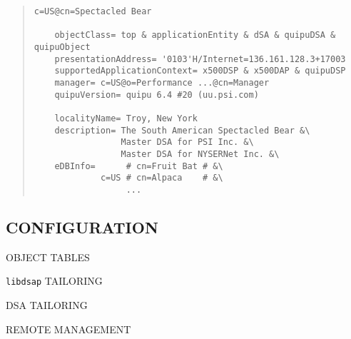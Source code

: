\begin{bwslide}

\begin{quote}\small\begin{verbatim}
c=US@cn=Spectacled Bear

    objectClass= top & applicationEntity & dSA & quipuDSA & quipuObject
    presentationAddress= '0103'H/Internet=136.161.128.3+17003
    supportedApplicationContext= x500DSP & x500DAP & quipuDSP
    manager= c=US@o=Performance ...@cn=Manager
    quipuVersion= quipu 6.4 #20 (uu.psi.com)

    localityName= Troy, New York
    description= The South American Spectacled Bear &\
                 Master DSA for PSI Inc. &\
                 Master DSA for NYSERNet Inc. &\
    eDBInfo=      # cn=Fruit Bat # &\
             c=US # cn=Alpaca    # &\
                  ...
\end{verbatim}\end{quote}
\end{bwslide}


\begin{bwslide}
\part*	{CONFIGURATION}\bf

\begin{nrtc}
\item	OBJECT TABLES

\item	\verb"libdsap" TAILORING

\item	DSA TAILORING

\item	REMOTE MANAGEMENT
\end{nrtc}
\end{bwslide}


